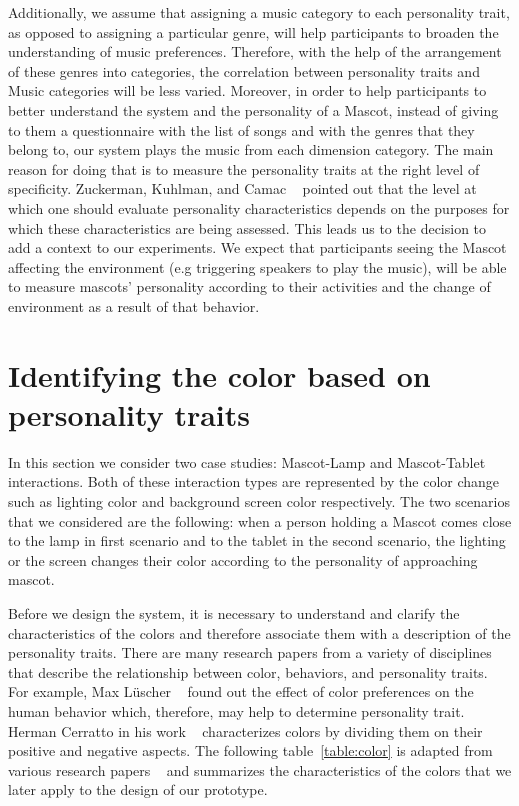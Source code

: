 \par Additionally, we assume that assigning a music category to each personality trait,
as opposed to assigning a particular genre, will help participants to broaden the understanding of music preferences.
Therefore, with the help of the arrangement of these genres into categories,
the correlation between personality traits and Music categories will be less varied.
Moreover, in order to help participants to better understand the system and the personality of a Mascot,
instead of giving to them a questionnaire with the list of songs and with the genres that they
belong to, our system plays the music from each dimension category.
The main reason for doing that is to measure the personality traits at the right level of specificity.
Zuckerman, Kuhlman, and Camac ~\cite{zuckerman1988lies} pointed out that the level at which one
should evaluate personality characteristics depends on the purposes for which these characteristics are being assessed.
This leads us to the decision to add a context to our experiments.
We expect that participants seeing the Mascot affecting the environment
(e.g triggering speakers to play the music), will be able to measure mascots'
personality according to their activities and the change of environment as a result of that behavior.

\section{Identifying the color based on personality traits}
\label{sec:Identifying the color based on personality traits}

In this section we consider two case studies: Mascot-Lamp and Mascot-Tablet interactions.
Both of these interaction types are represented by the color change such as
lighting color and background screen color respectively.
The two scenarios that we considered are the following: when a person holding a Mascot comes close
to the lamp in first scenario and to the tablet in the second scenario, the lighting
or the screen changes their color according to the personality of approaching mascot.

Before we design the system, it is necessary to understand and clarify the characteristics
of the colors and therefore associate them with a description of the personality traits.
There are many research papers from a variety of disciplines that describe the
relationship between color, behaviors, and personality traits.
For example, Max Lüscher ~\cite{luscher1971luscher} found out the effect of
color preferences on the human behavior which, therefore, may help to determine personality trait.
Herman Cerratto in his work ~\cite{cerrato2012meaning} characterizes colors by
dividing them on their positive and negative aspects.
The following table~\ref{table:color} is adapted from various research
papers ~\cite{luscher1971luscher,cerrato2012meaning,schaie1964color} and
summarizes the characteristics of the colors that we later apply to the design of our prototype.

